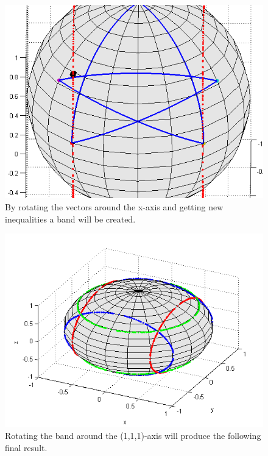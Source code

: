 \documentclass[•]{beamer}
\theoremstyle{remark}
\begin{document}
\begin{frame}
\begin{figure}[h!]
\begin{center}
\includegraphics[scale=0.4]{completeband111big.png}
\caption{By rotating the vectors around the x-axis and getting new inequalities a band will be created.}
\end{center}
\end{figure}
\end{frame}
\begin{frame}
\begin{figure}[h!]
\begin{center}
\includegraphics[scale=0.5]{coveredsphere.png}
\caption{Rotating the band around the (1,1,1)-axis will produce the following final result.}
\end{center}
\end{figure}
\end{frame}
\end{document}
